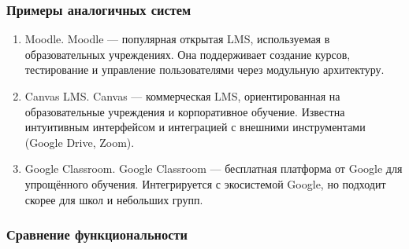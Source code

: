 \subsubsection{Примеры аналогичных систем}

\begin{enumerate}
	\item {Moodle.} Moodle --- популярная открытая LMS, используемая в образовательных учреждениях. Она поддерживает создание курсов, тестирование и управление пользователями через модульную архитектуру.
	\item {Canvas LMS.} Canvas --- коммерческая LMS, ориентированная на образовательные учреждения и корпоративное обучение. Известна интуитивным интерфейсом и интеграцией с внешними инструментами (Google Drive, Zoom).
	\item {Google Classroom.} Google Classroom --- бесплатная платформа от Google для упрощённого обучения. Интегрируется с экосистемой Google, но подходит скорее для школ и небольших групп.
\end{enumerate}

\subsubsection{Сравнение функциональности}

